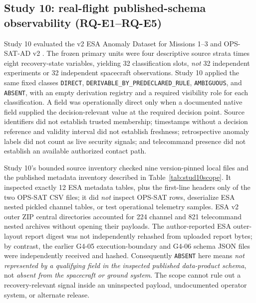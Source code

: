 \documentclass[preprint,12pt]{elsarticle}
\begin{document}
\subsection{Study 10: real-flight published-schema observability (RQ-E1--RQ-E5)}
Study 10 evaluated the v2 ESA Anomaly Dataset for Missions 1--3 \cite{esaad2025v2} and OPS-SAT-AD v2 \cite{opssat2024v2}. The frozen primary units were four descriptive source strata times eight recovery-state variables, yielding 32 classification slots, \emph{not} 32 independent experiments or 32 independent spacecraft observations. Study 10 applied the same fixed classes \texttt{DIRECT}, \texttt{DERIVABLE\_BY\_PREDECLARED\_RULE}, \texttt{AMBIGUOUS}, and \texttt{ABSENT}, with an empty derivation registry and a required visibility role for each classification. A field was operationally direct only when a documented native field supplied the decision-relevant value at the required decision point. Source identifiers did not establish trusted membership; timestamps without a decision reference and validity interval did not establish freshness; retrospective anomaly labels did not count as live security signals; and telecommand presence did not establish an available authorized contact path.

Study 10's bounded source inventory checked nine version-pinned local files and the published metadata inventory described in Table~\ref{tab:stud10scope}. It inspected exactly 12 ESA metadata tables, plus the first-line headers only of the two OPS-SAT CSV files; it did \emph{not} inspect OPS-SAT rows, deserialize ESA nested pickled channel tables, or test operational telemetry samples. ESA v2 outer ZIP central directories accounted for 224 channel and 821 telecommand nested archives without opening their payloads. The author-reported ESA outer-layout report digest was not independently rehashed from uploaded report bytes; by contrast, the earlier G4-05 execution-boundary and G4-06 schema JSON files were independently received and hashed. Consequently \texttt{ABSENT} here means \emph{not represented by a qualifying field in the inspected published data-product schema}, not \emph{absent from the spacecraft or ground system}. The scope cannot rule out a recovery-relevant signal inside an uninspected payload, undocumented operator system, or alternate release.
\end{document}
